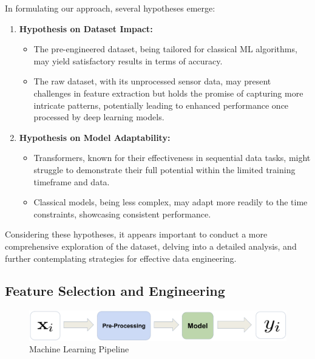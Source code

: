 \documentclass[conference]{IEEEtran}
\begin{document}
In formulating our approach, several hypotheses emerge:

\begin{enumerate}

  \item \textbf{Hypothesis on Dataset Impact:}
   \begin{itemize}
      \item The pre-engineered dataset, being tailored for classical ML algorithms, may yield satisfactory results in terms of accuracy.
      \item The raw dataset, with its unprocessed sensor data, may present challenges in feature extraction but holds the promise of capturing more intricate patterns, potentially leading to enhanced performance once processed by deep learning models.
   \end{itemize}

  \item \textbf{Hypothesis on Model Adaptability:}
   \begin{itemize}
      \item Transformers, known for their effectiveness in sequential data tasks, might struggle to demonstrate their full potential within the limited training timeframe and data.
      \item Classical models, being less complex, may adapt more readily to the time constraints, showcasing consistent performance.
   \end{itemize}

\end{enumerate}

Considering these hypotheses, it appears important to conduct a more comprehensive exploration of the dataset, delving into a detailed analysis, and further contemplating strategies for effective data engineering.

\subsection{Feature Selection and Engineering}

\begin{figure}[h!]
	\includegraphics[width= 0.9 \linewidth]{ML Pipeline.png}
	\centering
	\caption{Machine Learning Pipeline}
	\label{ML Pipeline.png}
\end{figure}
\end{document}
